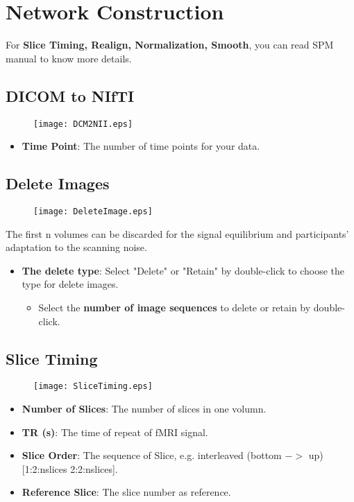 \documentclass[11pt]{article}
\begin{document}
	\section{Network Construction}
		For \textbf{Slice Timing, Realign, Normalization, Smooth}, you can read SPM manual to know more details.
		\subsection{DICOM to NIfTI}
			\begin{figure}
				\begin{center}
					\texttt{[image: DCM2NII.eps]}
				\end{center}
			\end{figure}
			\begin{itemize}
				\item \textbf{Time Point}: The number of time points for your data.
			\end{itemize}
		\subsection{Delete Images}
			\begin{figure}
				\begin{center}
					\texttt{[image: DeleteImage.eps]}
				\end{center}
			\end{figure}
			The first n volumes can be discarded for the signal equilibrium and participants' adaptation to the scanning noise.
			\begin{itemize}
				\item \textbf{The delete type}: Select "Delete" or "Retain" by double-click to choose the type for delete images.
				\begin{itemize}
					\item Select the \textbf{number of image sequences} to delete or retain by double-click.
				\end{itemize}
			\end{itemize}
		\subsection{Slice Timing}
			\begin{figure}
				\begin{center}
					\texttt{[image: SliceTiming.eps]}
				\end{center}
			\end{figure}
			\begin{itemize}
				\item \textbf{Number of Slices}: The number of slices in one volumn.
				\item \textbf{TR (s)}: The time of repeat of fMRI signal.
				\item \textbf{Slice Order}: The sequence of Slice, e.g. interleaved (bottom $->$ up) [1:2:nslices 2:2:nslices].
				\item \textbf{Reference Slice}: The slice number as reference.
			\end{itemize}
\end{document}
